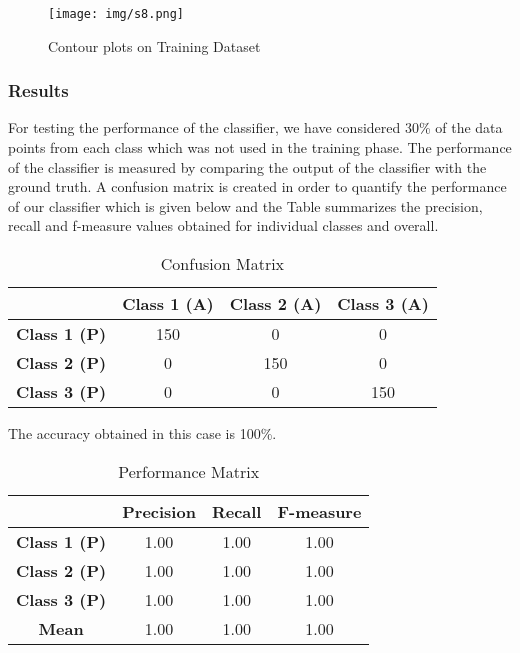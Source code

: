 \begin{figure}[!hbt]
     \centering
     \texttt{[image: img/s8.png]}
     \caption{Contour plots on Training Dataset}
     \label{fig:Figure11}
\end{figure}

\newpage
\subsubsection{Results} 
For testing the performance of the classifier, we have considered 30\% of the data points from each class which was not used in the training phase. The performance of the classifier is measured by comparing the output of the classifier with the ground truth. A confusion matrix is created in order to quantify the performance of our classifier which is given below and the Table summarizes
the precision, recall and f-measure values obtained for individual classes and overall.\\

\begin{table}[!hbt]
\centering
\begin{tabular}{|c|c|c|c|}
\hline
\ & \textbf{Class 1 (A)} & \textbf{Class 2 (A)} & \textbf{Class 3 (A)}\\
\hline
\textbf{Class 1 (P)} & 150 & 0 & 0 \\
\hline 
\textbf{Class 2 (P)} & 0 & 150 & 0 \\
\hline
\textbf{Class 3 (P)} & 0 & 0 & 150 \\
\hline
\end{tabular}
\caption{Confusion Matrix}
\label{tab:arch29}
\end{table}

The accuracy obtained in this case is 100\%.\\

\begin{table}[!hbt]
\centering
\begin{tabular}{|c|c|c|c|}
\hline
\ & \textbf{Precision} & \textbf{Recall} & \textbf{F-measure}\\
\hline
\textbf{Class 1 (P)} & 1.00 & 1.00 & 1.00 \\
\hline 
\textbf{Class 2 (P)} & 1.00 & 1.00 & 1.00 \\
\hline
\textbf{Class 3 (P)} & 1.00 & 1.00 & 1.00 \\
\hline
\textbf{Mean} & 1.00 & 1.00 & 1.00 \\
\hline
\end{tabular}
\caption{Performance Matrix}
\label{tab:arch29}
\end{table}

